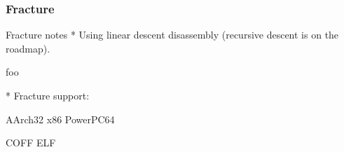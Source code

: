 
\subsubsection{Fracture}

Fracture notes
    * Using linear descent disassembly (recursive descent is on the roadmap).


foo

* Fracture support:

AArch32
x86
PowerPC64

COFF
ELF
